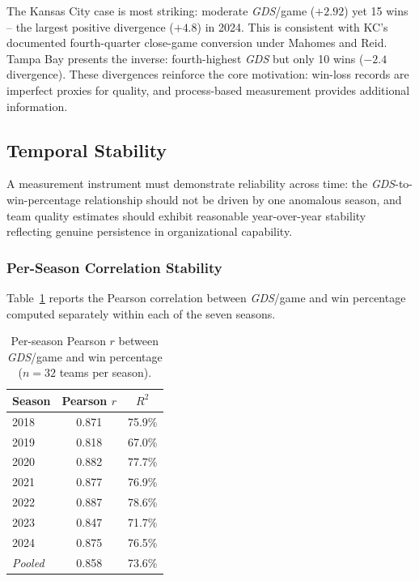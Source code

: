\documentclass[12pt,a4paper]{article}
\newcommand{\gds}{\textit{GDS}}
\begin{document}
The Kansas City case is most striking: moderate \gds{}/game ($+2.92$) yet 15 wins -- the largest positive divergence ($+4.8$) in 2024. This is consistent with KC's documented fourth-quarter close-game conversion under Mahomes and Reid. Tampa Bay presents the inverse: fourth-highest \gds{} but only 10 wins ($-2.4$ divergence). These divergences reinforce the core motivation: win-loss records are imperfect proxies for quality, and process-based measurement provides additional information.

\subsection{Temporal Stability}
\label{sec:temporal-stability}

A measurement instrument must demonstrate reliability across time: the \gds{}-to-win-percentage relationship should not be driven by one anomalous season, and team quality estimates should exhibit reasonable year-over-year stability reflecting genuine persistence in organizational capability.

\subsubsection{Per-Season Correlation Stability}

Table~\ref{tab:per-season} reports the Pearson correlation between \gds{}/game and win percentage computed separately within each of the seven seasons.

\begin{table}[htbp]
  \centering
  \caption{Per-season Pearson $r$ between \gds{}/game and win percentage ($n = 32$ teams per season).}
  \label{tab:per-season}
  \begin{tabular}{lcc}
    \toprule
    \textbf{Season} & \textbf{Pearson $r$} & \textbf{$R^2$} \\
    \midrule
    2018 & 0.871 & 75.9\% \\
    2019 & 0.818 & 67.0\% \\
    2020 & 0.882 & 77.7\% \\
    2021 & 0.877 & 76.9\% \\
    2022 & 0.887 & 78.6\% \\
    2023 & 0.847 & 71.7\% \\
    2024 & 0.875 & 76.5\% \\
    \midrule
    \textit{Pooled} & 0.858 & 73.6\% \\
    \bottomrule
  \end{tabular}
\end{table}
\end{document}
